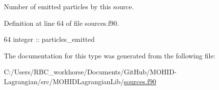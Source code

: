 Number of emitted particles by this source. 



Definition at line 64 of file sources.\+f90.


\begin{DoxyCode}
64         \textcolor{keywordtype}{integer} :: particles\_emitted
\end{DoxyCode}


The documentation for this type was generated from the following file\+:\begin{DoxyCompactItemize}
\item 
C\+:/\+Users/\+R\+B\+C\+\_\+workhorse/\+Documents/\+Git\+Hub/\+M\+O\+H\+I\+D-\/\+Lagrangian/src/\+M\+O\+H\+I\+D\+Lagrangian\+Lib/\mbox{\hyperlink{sources_8f90}{sources.\+f90}}\end{DoxyCompactItemize}
